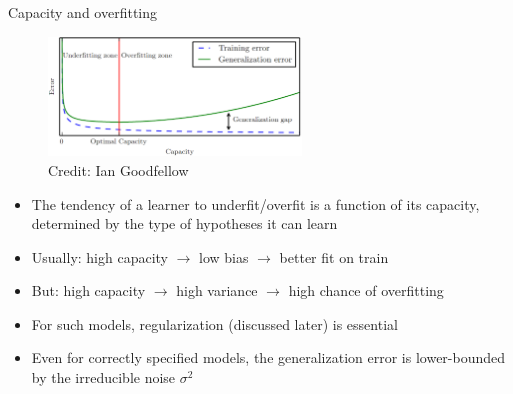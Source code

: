 \documentclass[11pt,compress,t,notes=noshow, xcolor=table]{beamer}
\begin{document}
\begin{vbframe}{Capacity and overfitting}

\begin{figure}
  \centering
  \includegraphics[width = 0.6\textwidth]{figure_man/lcurve_1.png}
  \tiny{\\ Credit: Ian Goodfellow}
\end{figure}


\begin{itemize}
  \item The tendency of a learner to underfit/overfit is a function of its capacity, determined by the type of hypotheses it can learn
  \item Usually: high capacity $\rightarrow$ low bias $\rightarrow$ better fit on train
  \item But: high capacity $\rightarrow$ high variance $\rightarrow$ high chance of overfitting
  \item For such models, regularization (discussed later) is essential
  \item Even for correctly specified models, the generalization error is lower-bounded by the irreducible noise $\sigma^2$
\end{itemize}
\end{vbframe}

\endlecture
\end{document}
